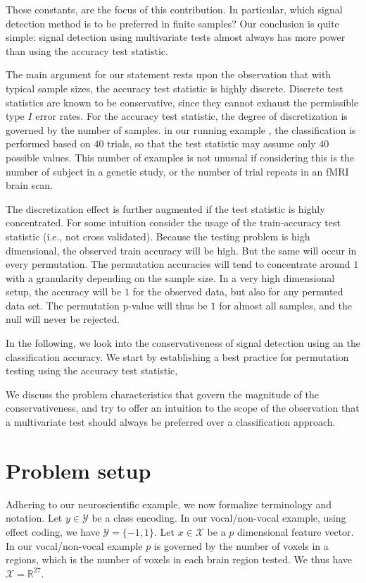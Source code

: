 \documentclass{pnastwo}
\newcommand{\set}[1]{\{ #1 \}} %
\newcommand{\reals}{\mathbb{R}} %
\newcommand{\features}{x} %
\newcommand{\outcomes}{y} %
\newcommand{\featureS}{\mathcal{X}} %
\newcommand{\outcomeS}{\mathcal{Y}} %
\begin{document}
\begin{article}
Those constants, are the focus of this contribution. In particular, which signal detection method is to be preferred in finite samples? 
Our conclusion is quite simple: signal detection using multivariate tests almost always has more power than using the accuracy test statistic.

The main argument for our statement rests upon the observation that with typical sample sizes, the accuracy test statistic is highly discrete. 
Discrete test statistics are known to be conservative, since they cannot exhaust the permissible type $I$ error rates. 
For the accuracy test statistic, the degree of discretization is governed by the number of samples. 
in our running example \cite{gilron_quantifying_2016}, the classification is performed based on $40$ trials, so that the test statistic may assume only $40$ possible values. 
This number of examples is not unusual if considering this is the number of subject in a genetic study, or the number of trial repeats in an fMRI brain scan. 

The discretization effect is further augmented if the test statistic is highly concentrated. 
For some intuition consider the usage of the train-accuracy test statistic (i.e., not cross validated).
Because the testing problem is high dimensional, the observed train accuracy will be high. But the same will occur in every permutation. 
The permutation accuracies will tend to concentrate around $1$ with a granularity depending on the sample size. 
In a very high dimensional setup, the accuracy will be $1$ for the observed data, but also for any permuted data set. 
The permutation p-value will thus be $1$ for almost all samples, and the null will never be rejected. 

In the following, we look into the conservativeness of signal detection using an the classification accuracy. 
We start by establishing a best practice for permutation testing using the accuracy test statistic, 

We discuss the problem characteristics that govern the magnitude of the conservativeness, and try to offer an intuition to the scope of the observation that a multivariate test should always be preferred over a classification approach. 


\section{Problem setup}
Adhering to our neuroscientific example, we now formalize terminology and notation. 
Let $\outcomes \in \outcomeS$ be a class encoding. In our vocal/non-vocal example, using effect coding, we have $\outcomeS=\set{-1,1}$.
Let $\features \in \featureS$ be a $p$ dimensional feature vector. 
In our vocal/non-vocal example $p$ is governed by the number of voxels in a regions, which is the number of voxels in each brain region tested. We thus have $\featureS=\reals^{27}$. 


\end{article}
\end{document}
